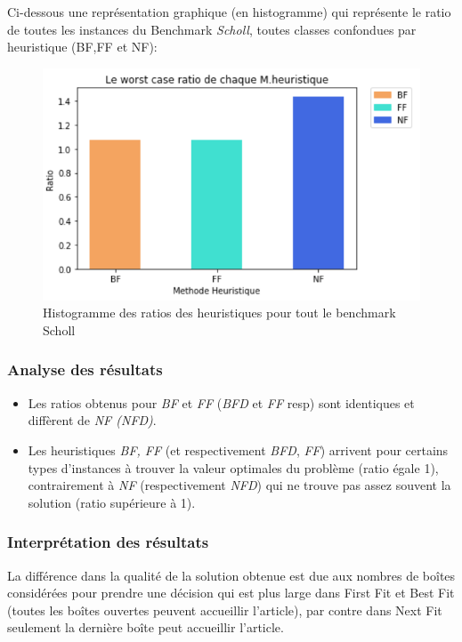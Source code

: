 \documentclass[class=article, crop=false]{standalone}
\begin{document}
Ci-dessous une représentation graphique (en histogramme) qui représente le ratio de toutes les instances du Benchmark \emph{Scholl}, toutes classes confondues par heuristique (BF,FF et NF): 

\begin{figure}[H] 
    \includegraphics[width=\linewidth]{../figures/Ratio_M_heuristiques.png}
    \caption{Histogramme des ratios des heuristiques pour tout le benchmark Scholl}
\end{figure}

\subsubsection{Analyse des résultats}
\begin{itemize}
    \item Les ratios obtenus pour \emph{BF} et \emph{FF} (\emph{BFD} et \emph{FF} resp) sont identiques et diffèrent de \emph{NF (NFD)}.
    \item Les heuristiques \emph{BF, FF} (et respectivement \emph{BFD}, \emph{FF}) arrivent pour certains types d’instances à trouver la valeur optimales du problème (ratio égale 1), contrairement à \emph{NF} (respectivement \emph{NFD}) qui ne trouve pas assez souvent la solution (ratio supérieure à 1).
\end{itemize}

\subsubsection{Interprétation des résultats}
La différence dans la qualité de la solution obtenue est due aux nombres de boîtes considérées pour prendre une décision qui est plus large dans First Fit et Best Fit (toutes les boîtes ouvertes peuvent accueillir l’article), par contre dans Next Fit seulement la dernière boîte peut accueillir l’article.
\end{document}
